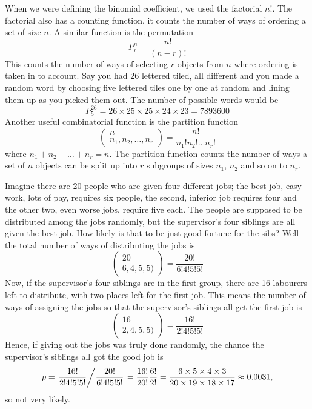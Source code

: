 \documentclass[11pt,a4paper]{scrartcl}
\begin{document}
When we were defining the binomial coefficient, we used the factorial
$n!$. The factorial also has a counting function, it counts the number
of ways of ordering a set of size $n$. A similar function is the permutation
\begin{equation}
P^n_r=\frac{n!}{(n-r)!}
\end{equation}
This counts the number of ways of selecting $r$ objects from $n$ where
ordering is taken in to account. Say you had 26 lettered tiled, all
different and you made a random word by choosing five lettered tiles one by one at
random and lining them up as you picked them out. The number of possible words would be
\begin{equation}
P^{26}_5=26\times 25\times 25\times 24\times 23=7893600
\end{equation}
Another useful combinatorial function is the partition function
\begin{equation}
\left(\begin{array}{c} n\\n_1,n_2,\ldots,n_r\end{array}\right)=\frac{n!}{n_1!n_2!\ldots n_r!}
\end{equation}
where $n_1+n_2+\ldots+n_r=n$. The partition function counts the number
of ways a set of $n$ objects can be split up into $r$ subgroups of
sizes $n_1$, $n_2$ and so on to $n_r$.

Imagine there are 20 people who are given four different jobs; the best
job, easy work, lots of pay, requires six people, the second,
inferior job requires four and the other two, even worse jobs, require
five each. The people are supposed to be distributed among the jobs
randomly, but the supervisor's four siblings are all given the best
job. How likely is that to be just good fortune for the sibs? Well the
total number of ways of distributing the jobs is
\begin{equation}
\left(\begin{array}{c} 20\\6,4,5,5)\end{array}\right)=\frac{20!}{6!4!5!5!}
\end{equation}
Now, if the supervisor's four siblings are in the first group, there
are 16 labourers left to distribute, with two places left for the first job. This means the number of ways of assigning the jobs so that the supervisor's siblings all get the first job is
\begin{equation}
\left(\begin{array}{c} 16\\2,4,5,5)\end{array}\right)=\frac{16!}{2!4!5!5!}
\end{equation}
Hence, if giving out the jobs was truly done randomly, the chance the supervisor's siblings all got the good job is
\begin{equation}
p=\left.\frac{16!}{2!4!5!5!}\middle/\frac{20!}{6!4!5!5!}\right.=\frac{16!}{20!}\frac{6!}{2!}
=\frac{6\times 5\times 4\times 3}{20\times 19\times 18\times 17}
\approx 0.0031,
\end{equation}
so not very likely.
\end{document}
